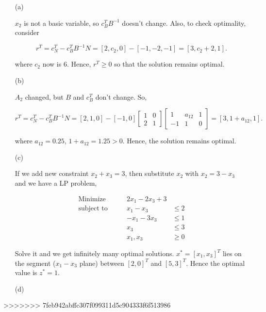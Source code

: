 \documentclass[12pt]{article}
\begin{document}
\begin{enumerate}

\item [(a)]

$x_2$ is not a basic variable, so $c_B^TB^{-1}$ doesn't change. Also, to check optimality, consider 

$$
r^T = c_N^T - c_B^TB^{-1}N = [2, c_2, 0] - [-1, -2, -1] = [3, c_2 + 2, 1]. 
$$

where $c_2$ now is $6$. Hence, $r^T \geqslant 0$ so that the solution remains optimal.

\item [(b)]

$A_2$ changed, but $B$ and $c_B^T$ don't change. So,

$$
r^T = c_N^T - c_B^TB^{-1}N = [2, 1, 0] - [-1, 0] \begin{bmatrix}
1 & 0 \\ 2 & 1
\end{bmatrix} \begin{bmatrix}
1 & a_{12} & 1 \\
-1 & 1 & 0
\end{bmatrix} = [3, 1+ a_{12}, 1]. 
$$

where $a_{12} = 0.25$, $1+ a_{12} = 1.25 >0$. Hence, the solution remains optimal.

\item [(c)]

If we add new constraint $x_2 + x_3 = 3$, then substitute $x_2$ with $x_2 = 3-x_3$ and we have a LP problem,

$$
\begin{aligned}
\text{Minimize} \qquad & 2x_1  - 2x_3 + 3 &  \\
\text{subject\  to} \qquad & x_1 - x_3 & \leqslant 2\\
 & -x_1 - 3x_3 & \leqslant 1 \\
 & x_3 & \leqslant 3 \\
 & x_1, x_3 & \geqslant 0
\end{aligned}
$$ 

Solve it and we get infinitely many optimal solutions. $x^* = [x_1, x_3]^T$ lies on the segment ($x_1-x_3$ plane) between $[2, 0]^T$ and $[5,3]^T$. Hence the optimal value is $z^* = 1$.

\item [(d)]




\end{enumerate}
>>>>>>> 7feb942abffc307f099311d5c904333f6f513986
\end{document}

